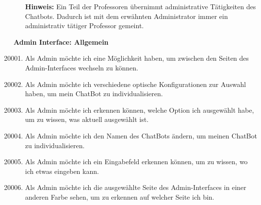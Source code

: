\begin{enumerate}[leftmargin=*,labelindent=40pt,label=u\arabic*.]
    \item[\textbf{Hinweis:}] Ein Teil der Professoren übernimmt administrative Tätigkeiten des Chatbots. Dadurch ist mit dem erwähnten Administrator immer ein administrativ tätiger Professor gemeint.
\end{enumerate}
\newpage
\textbf{Admin Interface: Allgemein}
\begin{enumerate}[leftmargin=*,labelindent=40pt,label=u\arabic*.]
    \setcounter{enumi}{20000}
    \item Als Admin möchte ich eine Möglichkeit haben, um zwischen den Seiten des Admin-Interfaces wechseln zu können.
    \item Als Admin möchte ich verschiedene optische Konfigurationen zur Auswahl haben, um mein ChatBot zu individualisieren.
    \item Als Admin möchte ich erkennen können, welche Option ich ausgewählt habe, um zu wissen, was aktuell ausgewählt ist.
    \item Als Admin möchte ich den Namen des ChatBots ändern, um meinen ChatBot zu individualisieren.
    \item Als Admin möchte ich ein Eingabefeld erkennen können, um zu wissen, wo ich etwas eingeben kann.
    \item Als Admin möchte ich die ausgewählte Seite des Admin-Interfaces in einer anderen Farbe sehen, um zu erkennen auf welcher Seite ich bin.
\end{enumerate}

